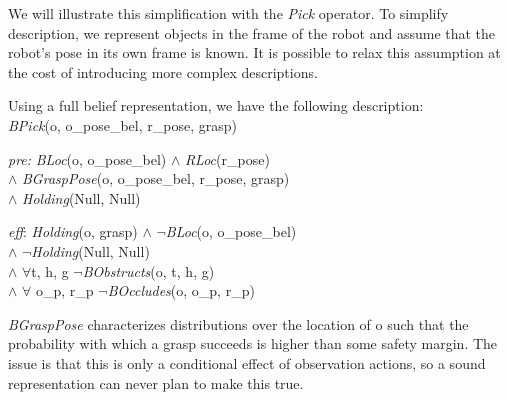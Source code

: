 We will illustrate this simplification with the \emph{Pick}
operator. To simplify description, we represent objects in the frame
of the robot and assume that the robot's pose in its own frame is
known. It is possible to relax this assumption at the cost of
introducing more complex descriptions.

Using a full belief representation, we have the following
description:\\
\emph{BPick}(o, o\_pose\_bel, r\_pose, grasp)
\vspace{-2mm}
\begin{tightlist}
\item[\emph{pre:}] \emph{BLoc}(o, o\_pose\_bel) $\wedge$
  \emph{RLoc}(r\_pose) \\$\wedge$ \emph{BGraspPose}(o, o\_pose\_bel,
  r\_pose, grasp) \\$\wedge$ \emph{Holding}(Null, Null)
\item[\emph{eff}:] \emph{Holding}(o, grasp) $\wedge$
  $\lnot$\emph{BLoc}(o, o\_pose\_bel) \\$\wedge$
  $\lnot$\emph{Holding}(Null, Null) \\$\wedge$ $\forall$t, h, g
  $\lnot$\emph{BObstructs}(o, t, h, g)\\$\wedge$ $\forall$ o\_p,
  r\_p $\lnot$\emph{BOccludes}(o, o\_p, r\_p)
\end{tightlist}
\emph{BGraspPose} characterizes distributions over the location of o
such that the probability with which a grasp succeeds is higher than
some safety margin. The issue is that this is only a conditional
effect of observation actions, so a sound representation can never
plan to make this true.  

